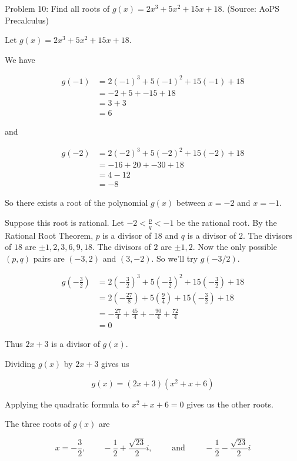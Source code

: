 Problem 10: Find all roots of $g(x) = 2x^3 + 5x^2 + 15x + 18$. (Source: AoPS Precalculus)

Let $g(x) = 2x^3 + 5x^2 + 15x + 18$.

We have

\begin{align*}
g(-1) &= 2(-1)^3 + 5(-1)^2 + 15(-1) + 18 \\
&= -2 + 5 + -15 + 18 \\
&= 3 + 3 \\
&= 6
\end{align*}

and

\begin{align*}
g(-2) &= 2(-2)^3 + 5(-2)^2 + 15(-2) + 18 \\
&= -16 + 20 + -30 + 18 \\
&= 4 - 12 \\
&= -8
\end{align*}

So there exists a root of the polynomial $g(x)$ between $x = -2$ and $x = -1$.

Suppose this root is rational. Let $-2 < \frac{p}{q} < -1$ be the rational root. By the Rational Root Theorem, $p$ is a divisor of 18 and $q$ is a divisor of $2$. The divisors of $18$ are $\pm 1, 2, 3, 6, 9, 18$. The divisors of $2$ are $\pm 1, 2$. Now the only possible $(p, q)$ pairs are $(-3, 2)$ and $(3, -2)$. So we'll try $g(-3/2)$.

\begin{align*}
g\left(-\frac{3}{2}\right) &= 2\left(-\frac{3}{2}\right)^3 + 5\left(-\frac{3}{2}\right)^2 + 15\left(-\frac{3}{2}\right) + 18 \\
&= 2\left(-\frac{27}{8}\right) + 5\left(\frac{9}{4}\right) + 15\left(-\frac{3}{2}\right) + 18 \\
&= -\frac{27}{4} + \frac{45}{4} + -\frac{90}{4} + \frac{72}{4} \\
&= 0
\end{align*}

Thus $2x + 3$ is a divisor of $g(x)$.

Dividing $g(x)$ by $2x + 3$ gives us

\[ g(x) = (2x + 3)(x^2 + x + 6) \]

Applying the quadratic formula to $x^2 + x + 6 = 0$ gives us the other roots.

The three roots of $g(x)$ are

\[ 
\boxed{x = -\frac{3}{2}, \qquad -\frac{1}{2} + \frac{\sqrt{23}}{2}i, \qquad \text{ and } \qquad -\frac{1}{2} - \frac{\sqrt{23}}{2}i} 
\]
